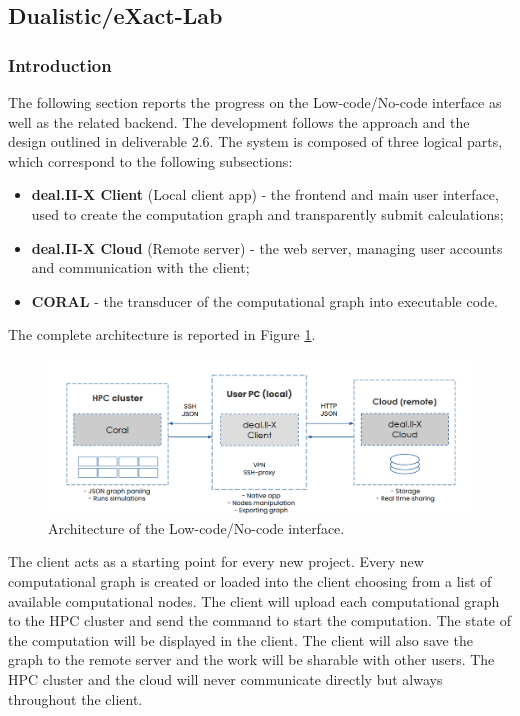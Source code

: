 \documentclass[a4paper,12pt]{article}
\begin{document}
\subsection{Dualistic/eXact-Lab}

\subsubsection{Introduction}
The following section reports the progress on the Low-code/No-code interface as well as the related backend. The development follows the approach and the design outlined in deliverable 2.6. The system is composed of three logical parts, which correspond to the following subsections:
\begin{itemize}
  \item \textbf{deal.II-X Client} (Local client app) - the frontend and main user interface, used to create the computation graph and transparently submit calculations;
  \item \textbf{deal.II-X Cloud} (Remote server) - the web server, managing user accounts and communication with the client;
  \item \textbf{CORAL} - the transducer of the computational graph into executable code.
\end{itemize}
The complete architecture is reported in Figure \ref{fig:dualistic-architecture}.

\begin{figure}
  \centering

  \includegraphics[width=\textwidth]{dualistic-architecture.png}

  \caption{Architecture of the Low-code/No-code interface.}
  \label{fig:dualistic-architecture}
\end{figure}

The client acts as a starting point for every new project. Every new computational graph is created or loaded into the client choosing from a list of available computational nodes. The client will upload each computational graph to the HPC cluster and send the command to start the computation. The state of the computation will be displayed in the client. The client will also save the graph to the remote server and the work will be sharable with other users. The HPC cluster and the cloud will never communicate directly but always throughout the client.
\end{document}
